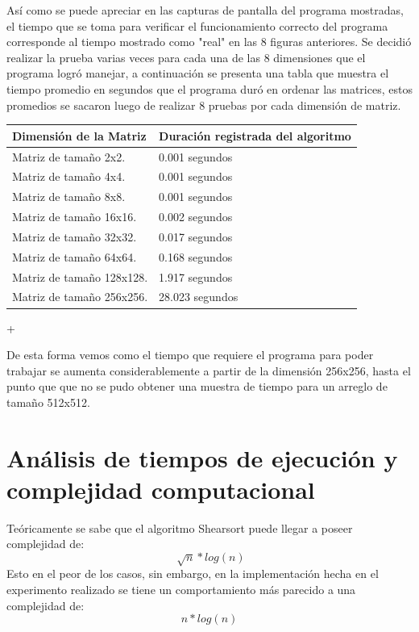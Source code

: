 \documentclass[11pt]{article}
\begin{document}
Así como se puede apreciar en las capturas de pantalla del programa mostradas, el tiempo que se toma para verificar el funcionamiento correcto del programa corresponde al tiempo mostrado como "real" en las 8 figuras anteriores. Se decidió realizar la prueba varias veces para cada una de las 8 dimensiones que el programa logró manejar, a continuación se presenta una tabla que muestra el tiempo promedio en segundos que el programa duró en ordenar las matrices, estos promedios se sacaron luego de realizar 8 pruebas por cada dimensión de matriz. 

\begin{table}[H]
\centering
\begin{tabular}{p{5cm} p{8cm}}
\hline
Dimensión de la Matriz & Duración registrada del algoritmo \\
\hline \hline
Matriz de tamaño 2x2. & 0.001 segundos \\
\hline
Matriz de tamaño 4x4. & 0.001 segundos\\
\hline
Matriz de tamaño 8x8. & 0.001 segundos\\
\hline
Matriz de tamaño 16x16. & 0.002 segundos\\ 
\hline
Matriz de tamaño 32x32. & 0.017 segundos\\ 
\hline
Matriz de tamaño 64x64. & 0.168 segundos\\ 
\hline
Matriz de tamaño 128x128. & 1.917 segundos\\ 
\hline
Matriz de tamaño 256x256. & 28.023 segundos\\ 
\hline
\end{tabular}+
\label{tabla:Tiempos}
\end{table}

De esta forma vemos como el tiempo que requiere el programa para poder trabajar se aumenta considerablemente a partir de la dimensión 256x256, hasta el punto que que no se pudo obtener una muestra de tiempo para un arreglo de tamaño 512x512.



\section{Análisis de tiempos de ejecución y complejidad computacional}

Teóricamente se sabe que el algoritmo Shearsort puede llegar a poseer complejidad de: \begin{equation}
\sqrt[]{n}*log(n)
\end{equation}Esto en el peor de los casos, sin embargo, en la implementación hecha en el experimento realizado se tiene un comportamiento más parecido a una complejidad de: \begin{equation}
n*log(n)
\end{equation}
\end{document}
